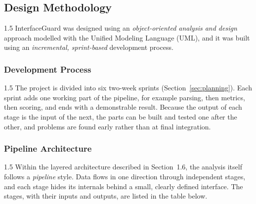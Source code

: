 \documentclass[12pt,a4paper]{article}
\begin{document}
\subsection{Design Methodology}

\begin{spacing}{1.5}
\justifying
InterfaceGuard was designed using an \emph{object-oriented analysis and
design} approach modelled with the Unified Modeling Language (UML), and it
was built using an \emph{incremental, sprint-based} development process.
\end{spacing}

\subsubsection{Development Process}

\begin{spacing}{1.5}
\justifying
The project is divided into six two-week sprints (Section~\ref{sec:planning}).
Each sprint adds one working part of the pipeline, for example parsing, then
metrics, then scoring, and ends with a demonstrable result. Because the
output of each stage is the input of the next, the parts can be built and
tested one after the other, and problems are found early rather than at final
integration.
\end{spacing}

\subsubsection{Pipeline Architecture}

\begin{spacing}{1.5}
\justifying
Within the layered architecture described in Section~1.6, the analysis
itself follows a \emph{pipeline} style. Data flows in one direction through
independent stages, and each stage hides its internals behind a small,
clearly defined interface. The stages, with their inputs and outputs, are
listed in the table below.
\end{spacing}
\end{document}
